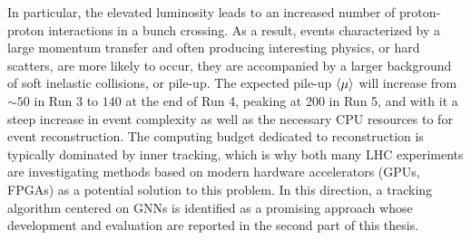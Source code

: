 In particular, the elevated luminosity leads to an increased number of proton-proton interactions in a bunch crossing.
As a result, events characterized by a large momentum transfer and often producing interesting physics, or hard scatters, are more likely to occur, they are accompanied by a larger background of soft inelastic collisions, or pile-up. 
The expected pile-up $\expval{\mu}$ will increase from $\sim50$ in Run 3 to $140$ at the end of Run 4, peaking at 200 in Run 5, and with it a steep increase in event complexity as well as the necessary CPU resources to for event reconstruction.
The computing budget dedicated to reconstruction is typically dominated by inner tracking, which is why both many LHC experiments are investigating methods based on modern hardware accelerators (GPUs, FPGAs) as a potential solution to this problem. 
In this direction, a tracking algorithm centered on GNNs is identified as a promising approach whose development and evaluation are reported in the second part of this thesis. 


